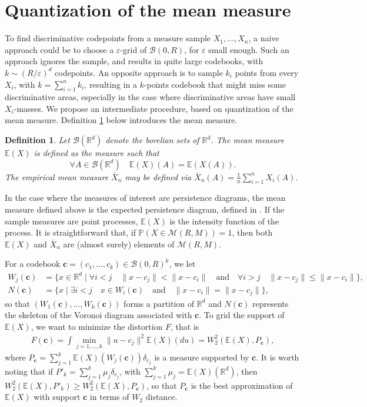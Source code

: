 \documentclass[noinfoline,preprint]{article}
\newtheorem{defi}[theorem]{Definition}
\newcommand{\cb}{\mathbf{c}}
\newcommand{\R}{\mathbb{R}}
\newcommand{\E}{\mathbb{E}}
\renewcommand{\1}{\mathds 1}
\newcommand{\B}{\mathcal{B}}
\begin{document}
\section{Quantization of the mean measure}\label{sec:mean_measure_quantization} 

To find discriminative codepoints from a measure sample $X_1, \hdots, X_n$, a naive approach could be to choose a $\varepsilon$-grid of $\B(0,R)$, for $\varepsilon$ small enough. Such an approach ignores the sample, and results in quite large codebooks, with $k \sim (R/\varepsilon)^{d}$ codepoints. An opposite approach is to sample $k_i$ points from every $X_i$, with $k=\sum_{i=1}^n k_i$, resulting in a $k$-points codebook that might miss some discriminative areas, especially in the case where discriminative areas have small $X_i$-masses. We propose an intermediate procedure, based on quantization of the mean measure. Definition \ref{def:mean_measure} below introduces the mean measure.  
\begin{defi}\label{def:mean_measure} Let $\mathcal{B}(\R^d)$ denote the borelian sets of $\R^d$. The \textit{mean measure} $\mathbb{E}(X)$ is defined as the  measure such that 
\[
\forall A \in \mathcal{B}(\R^d) \quad  \E(X)(A) = \mathbb{E} \left( X(A) \right ).
\]
The \textit{empirical mean measure} $\bar{X}_n$ may be defined via  $\bar{X}_n(A) = \frac{1}{n} \sum_{i=1}^n X_i(A)$.
\end{defi}
In the case where the measures of interest are persistence diagrams, the mean measure defined above is  the expected persistence diagram, defined in \cite{ChazalDivol18}. If the sample measures are point processes, $\E(X)$ is the intensity function of the process. It is straightforward that, if $\mathbb{P} \left ( X \in \mathcal{M}(R,M) \right )=1$, then both $\E(X)$ and $\bar{X}_n$ are (almost surely) elements of $\mathcal{M}(R,M)$. 

For a codebook $\cb = (c_1, \hdots, c_k) \in \mathcal{B}(0,R)^k$, we let 
\begin{align*}
W_j(\cb)& = \{ x \in \mathbb{R}^d \mid  \forall i < j \quad \| x- c_j\| < \| x-c_i\| \quad \mbox{and} \quad \forall{i >j} \quad \| x- c_j\| \leq \|x-c_i\| \}, \\
N(\cb) & = \{x \mid \exists i < j \quad x \in W_i(\cb) \quad \mbox{and} \quad \|x-c_i\| = \|x-c_j\| \}, 
\end{align*}
so that $(W_1(\cb), \hdots, W_k(\cb))$ forms a partition of $\R^d$ and $N(\cb)$ represents the skeleton of the Voronoi diagram associated with $\cb$. To grid the support of $\E(X)$, we want to minimize the distortion $F$, that is 
\begin{align*}
F(\cb) = \int  \min_{j=1, \hdots, k} \|u-c_j\|^2 \E(X)(du) = W_2^2 (\E(X),P_\cb),
\end{align*}
where $P_\cb = \sum_{j=1}^k \E(X)(W_j(\cb)) \delta_{c_j}$ is a measure supported by $\cb$. It is worth noting that if $P'_k = \sum_{j=1}^k \mu_j \delta_{c_j}$, with $\sum_{j=1}^{k} \mu_j = \E(X)(\R^d)$, then $W_2^2(\E(X),P'_k)\geq W_2^2 (\E(X),P_\cb)$, so that $P_\cb$ is the best approximation of $\E(X)$ with support $\cb$ in terms of $W_2$ distance.
\end{document}

